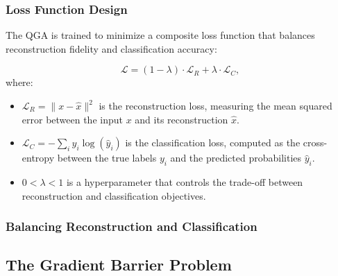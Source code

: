 \documentclass[conference]{IEEEtran}
\begin{document}
\subsubsection{Loss Function Design}






The QGA is trained to minimize a composite loss 
function that balances reconstruction fidelity and 
classification accuracy:

\begin{equation}
    \mathcal{L} = (1-\lambda) \cdot \mathcal{L}_R + \lambda \cdot \mathcal{L}_{C},
\end{equation}
where:
\begin{itemize}
    \item \( \mathcal{L}_R = \| x - \hat{x} \|^2 \) is the reconstruction loss, measuring the mean squared error between the input \( x \) and its reconstruction \( \hat{x} \).
    \item \( \mathcal{L}_C = -\sum_i y_i \log(\hat{y}_i) \) is the classification loss, computed as the cross-entropy between the true labels \( y_i \) and the predicted probabilities \( \hat{y}_i \).
    \item \( 0 < \lambda < 1 \) is a hyperparameter that controls the trade-off between reconstruction and classification objectives.
\end{itemize}    

\subsubsection{Balancing Reconstruction and Classification}


\subsection{The Gradient Barrier Problem}
\end{document}
